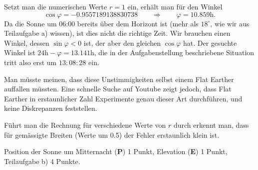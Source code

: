 \begin{loesung}
\begin{teilaufgaben}
Setzt man die numerischen Werte $r=1$ ein, erhält man für
den Winkel
\[
\cos\varphi= -0.9557189138830738
\qquad\Rightarrow\qquad
\varphi = 10.859\text{h}.
\]
Da die Sonne um 06:00 bereits über dem Horizont ist (mehr als $18^\circ$,
wie wir aus Teilaufgabe a) wissen), ist dies nicht die richtige Zeit.
Wir brauchen einen Winkel, dessen $\sin\varphi<0$ ist, der aber
den gleichen $\cos\varphi$ hat.
Der gesuchte Winkel ist $24\text{h}-\varphi=13.141\text{h}$, die
in der Aufgabenstellung beschriebene Situation tritt also erst um
$13:08:28$ ein. 
\end{teilaufgaben}
Man müsste meinen, dass diese Unstimmigkeiten selbst einem Flat Earther 
auffallen müssten.
Eine schnelle Suche auf Youtube zeigt jedoch, dass Flat Earther in
erstaunlicher Zahl Experimente genau dieser Art durchführen, und keine
Diskrepanzen feststellen.

Führt man die Rechnung für verschiedene Werte von $r$ durch erkennt man,
dass für gemässigte Breiten (Werte um 0.5) der Fehler erstaunlich klein
ist.
\end{loesung}


\begin{bewertung}
Position der Sonne um Mitternacht ({\bf P}) 1 Punkt,
Elevation ({\bf E}) 1 Punkt,
Teilaufgabe b) 4 Punkte.
\end{bewertung}

